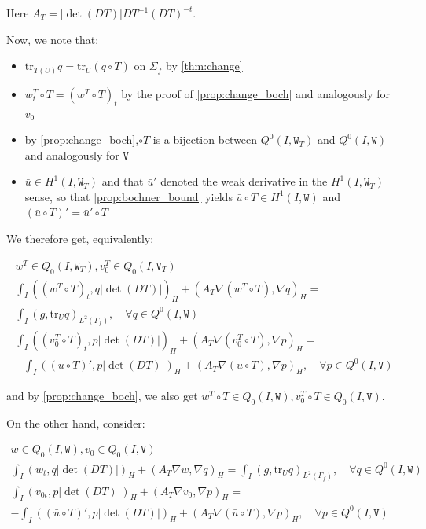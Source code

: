 \documentclass[english,a4paper,9pt,oneside]{scrbook}	%
\theoremstyle{break}
\theoremstyle{remark}
\newcommand{\tr}{\text{tr}}
\newcommand{\tred}[1]{\textcolor{red}{#1}}
\newcommand{\tw}[1]{\texttt{#1}}
\begin{document}
\begin{appendices}
Here $A_T = |\det(DT)|DT^{-1}(DT)^{-t}$.

Now, we note that:

\begin{itemize}
	\item $\tr_{T(U)} q = \tr_U(q\circ T)$ on $\Sigma_f$ by \cref{thm:change}
	\item $w_t^T\circ T = (w^T\circ T)_t$ by the proof of \cref{prop:change_boch} and analogously for $v_0$
	\item by \cref{prop:change_boch},$\circ T$ is a bijection between $Q^0(I,\tw{W}_T)$ and $Q^0(I,\tw{W})$ and analogously for $\tw{V}$
	\item $\bar{u} \in H^1(I,\tw{W}_T)$ and that $\bar{u}'$ denoted the weak derivative in the $H^1(I,\tw{W}_T)$ sense, so that \cref{prop:bochner_bound} yields $\bar{u}\circ T \in H^1(I,\tw{W})$ and $(\bar{u}\circ T )' = \bar{u}'\circ T $
\end{itemize}

We therefore get, equivalently:

\begin{align*}
w^T \in Q_0(I, \tw{W}_T), v_0^T \in Q_0(I,\tw{V}_T) \\
\int_I ( (w^T\circ T)_t , q |\det(DT)|)_H+ (A_T\nabla (w^T\circ T), \nabla q)_{H} =\\ \int_I(g,\tr_{U} q)_{L^2(\Gamma_f)}, \quad \forall q \in Q^0(I, \tw{W}) \\
\int_I ( (v_0^T\circ T)_t,p |\det(DT)|)_H + (A_T \nabla (v_0^T\circ T), \nabla p)_{H}=\\ -\int_I((\bar{u}\circ T)',p|\det(DT)|)_{H}+(A_T \nabla (\bar{u} \circ T), \nabla p)_{H}, \quad \forall p \in Q^0(I, \tw{V})
\end{align*}

and by \cref{prop:change_boch}, we also get $w^T\circ T \in Q_0(I,\tw{W}), v_0^T\circ T \in Q_0(I,\tw{V})$.


On the other hand, consider:

\begin{align*}
w \in Q_0(I, \tw{W}), v_0 \in Q_0(I,\tw{V}) \\
\int_I ( w_t , q |\det(DT)|)_H+ (A_T\nabla w, \nabla q)_{H} =\int_I(g,\tr_{U} q)_{L^2(\Gamma_f)}, \quad \forall q \in Q^0(I, \tw{W}) \\
\int_I ( v_{0t},p |\det(DT)|)_H + (A_T \nabla v_0, \nabla p)_{H}=\\ -\int_I((\bar{u}\circ T)',p|\det(DT)|)_{H}+(A_T \nabla (\bar{u} \circ T), \nabla p)_{H}, \quad \forall p \in Q^0(I, \tw{V})
\end{align*}


\end{appendices}
\end{document}
